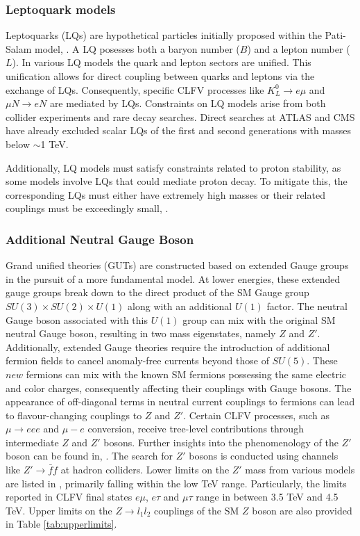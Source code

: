\subsubsection{Leptoquark models}
Leptoquarks (LQs) are hypothetical particles initially 
proposed within the Pati-Salam model, \cite{PhysRevD.10.275}. 
A LQ posesses both a baryon number ($B$) and a lepton number ($L$). 
In various LQ models the quark and lepton sectors are unified. This 
unification allows for direct coupling between quarks and leptons via 
the exchange of LQs. Consequently, specific CLFV processes like 
$K_L^0 \rightarrow e \mu$ and $\mu N \rightarrow e N$ are mediated by LQs. 
Constraints on LQ models arise from both collider experiments and rare decay 
searches. Direct searches at ATLAS and CMS have already excluded scalar LQs of the 
first and second generations with masses below $\sim$1 TeV.

Additionally, LQ models must satisfy constraints related to 
proton stability, as some models involve LQs that could mediate 
proton decay. To mitigate this, the corresponding LQs must either 
have extremely high masses or their related couplings must be 
exceedingly small, \cite{DORSNER20161}.
\subsubsection{Additional Neutral Gauge Boson}
Grand unified theories (GUTs) are constructed based on 
extended Gauge groups in the pursuit of a more fundamental model. 
At lower energies, these extended gauge groups break down to the 
direct product of the SM Gauge group $SU(3) \times SU(2) \times U(1)$ 
along with an additional $U(1)$ factor. The neutral Gauge boson 
associated with this $U(1)$ group can mix with the original SM 
neutral Gauge boson, resulting in two mass eigenstates, namely 
$Z$ and $Z'$. Additionally, extended Gauge theories require the 
introduction of additional fermion fields to cancel anomaly-free 
currents beyond those of $SU(5)$. These $new$ fermions can mix 
with the known SM fermions possessing the same electric and color 
charges, consequently affecting their couplings with Gauge bosons. 
The appearance of off-diagonal terms in neutral current couplings 
to fermions can lead to flavour-changing couplings to $Z$ and $Z'$. 
Certain CLFV processes, such as $\mu \rightarrow eee$ and $\mu-e$ 
conversion, receive tree-level contributions through intermediate 
$Z$ and $Z'$ bosons. Further insights into the phenomenology of the 
$Z'$ boson can be found in, \cite{Leike_1999}. The search for 
$Z'$ bosons is conducted using channels like $Z' \rightarrow \bar{f}f$ 
at hadron colliders. Lower limits on the $Z'$ mass from various models 
are listed in \cite{zyla}, primarily falling within the low TeV range. 
Particularly, the limits reported in CLFV final states $e\mu$, $e\tau$ 
and $\mu\tau$ range in between 3.5 TeV and 4.5 TeV. Upper limits on the 
$Z \rightarrow l_1 l_2$ couplings of the SM $Z$ boson are also provided 
in Table \ref{tab:upperlimits}.

